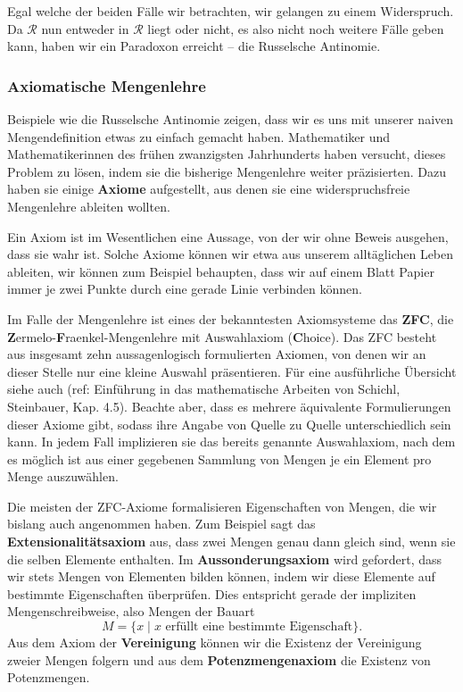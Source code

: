 \documentclass[../../main.tex]{subfiles}
\newcommand{\R}{\ensuremath{\mathcal{R}}\xspace}
\begin{document}
Egal welche der beiden Fälle wir betrachten, wir gelangen zu einem Widerspruch. Da \R nun entweder in \R liegt oder nicht, es also nicht noch weitere Fälle geben kann, haben wir ein Paradoxon erreicht -- die Russelsche Antinomie. 

\subsubsection{Axiomatische Mengenlehre}
Beispiele wie die Russelsche Antinomie zeigen, dass wir es uns mit unserer naiven Mengendefinition etwas zu einfach gemacht haben. Mathematiker und Mathematikerinnen des frühen zwanzigsten Jahrhunderts haben versucht, dieses Problem zu lösen, indem sie die bisherige Mengenlehre weiter präzisierten. Dazu haben sie einige \textbf{Axiome} aufgestellt, aus denen sie eine widerspruchsfreie Mengenlehre ableiten wollten.

Ein Axiom ist im Wesentlichen eine Aussage, von der wir ohne Beweis ausgehen, dass sie wahr ist. Solche Axiome können wir etwa aus unserem alltäglichen Leben ableiten, wir können zum Beispiel behaupten, dass wir auf einem Blatt Papier immer je zwei Punkte durch eine gerade Linie verbinden können.

Im Falle der Mengenlehre ist eines der bekanntesten Axiomsysteme das \textbf{ZFC}, die \textbf{Z}ermelo-\textbf{F}raenkel-Mengenlehre mit Auswahlaxiom (\textbf{C}hoice). Das ZFC besteht aus insgesamt zehn aussagenlogisch formulierten Axiomen, von denen wir an dieser Stelle nur eine kleine Auswahl präsentieren. Für eine ausführliche Übersicht siehe auch (ref: Einführung in das mathematische Arbeiten von Schichl, Steinbauer, Kap. 4.5). Beachte aber, dass es mehrere äquivalente Formulierungen dieser Axiome gibt, sodass ihre Angabe von Quelle zu Quelle unterschiedlich sein kann. In jedem Fall implizieren sie das bereits genannte Auswahlaxiom, nach dem es möglich ist aus einer gegebenen Sammlung von Mengen je ein Element pro Menge auszuwählen.

Die meisten der ZFC-Axiome formalisieren Eigenschaften von Mengen, die wir bislang auch angenommen haben. Zum Beispiel sagt das \textbf{Extensionalitätsaxiom} aus, dass zwei Mengen genau dann gleich sind, wenn sie die selben Elemente enthalten. Im \textbf{Aussonderungsaxiom} wird gefordert, dass wir stets Mengen von Elementen bilden können, indem wir diese Elemente auf bestimmte Eigenschaften überprüfen. Dies entspricht gerade der impliziten Mengenschreibweise, also Mengen der Bauart $$M = \{x \mid x \text{ erfüllt eine bestimmte Eigenschaft}\}.$$ Aus dem Axiom der \textbf{Vereinigung} können wir die Existenz der Vereinigung zweier Mengen folgern und aus dem \textbf{Potenzmengenaxiom} die Existenz von Potenzmengen. 
\end{document}
